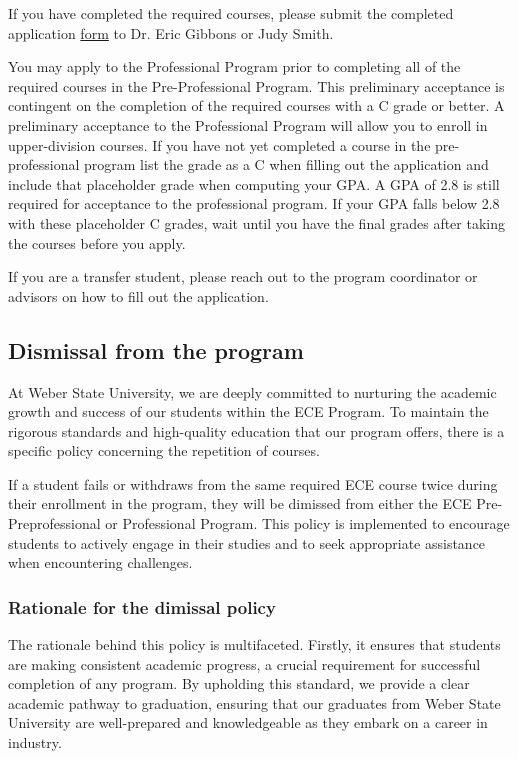 If you have completed the required courses, please submit the completed application \href{https://weber.edu/ece/advising.html}{form} to Dr. Eric Gibbons or Judy Smith.  

You may apply to the Professional Program prior to completing all of the required courses in the Pre-Professional Program.  This preliminary acceptance is contingent on the completion of the required courses with a C grade or better.  A preliminary acceptance to the Professional Program will allow you to enroll in upper-division courses.   If you have not yet completed a course in the pre-professional program list the grade as a C when filling out the application and include that placeholder grade when computing your GPA.  A GPA of 2.8 is still required for acceptance to the professional program.  If your GPA falls below 2.8 with these placeholder C grades, wait until you have the final grades after taking the courses before you apply.  

If you are a transfer student, please reach out to the program coordinator or advisors on how to fill out the application.  

\subsection{Dismissal from the program}
\label{sec:dism-from-progr}

At Weber State University, we are deeply committed to nurturing the academic growth and success of our students within the ECE Program. To maintain the rigorous standards and high-quality education that our program offers, there is a specific policy concerning the repetition of courses.

If a student fails or withdraws from the same required ECE course twice during their enrollment in the program, they will be dimissed from either the ECE Pre-Preprofessional or Professional Program. This policy is implemented to encourage students to actively engage in their studies and to seek appropriate assistance when encountering challenges.

\subsubsection{Rationale for the dimissal policy}
\label{sec:rati-dimiss-policy}


The rationale behind this policy is multifaceted. Firstly, it ensures that students are making consistent academic progress, a crucial requirement for successful completion of any program. By upholding this standard, we provide a clear academic pathway to graduation, ensuring that our graduates from Weber State University are well-prepared and knowledgeable as they embark on a career in industry.

